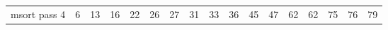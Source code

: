 \documentclass{article}
\begin{document}
\begin{tabular}{l*{15}{c}r}
                                                                                                                                                                                                                                                                                                                                                                                                                                            msort pass 4 & 6 & 13 & 16 & 22 & 26 & 27 & 31 & 33 & 36 & 45 & 47 & 62 & 62 & 75 & 76 & 79 \\ 
                                                                                                                                                                                                                                                                                                                                                                                                                                                        
                                                                                                                                                                                                                                                                                                                                                                                                                                                                \end{tabular}
\end{document}
